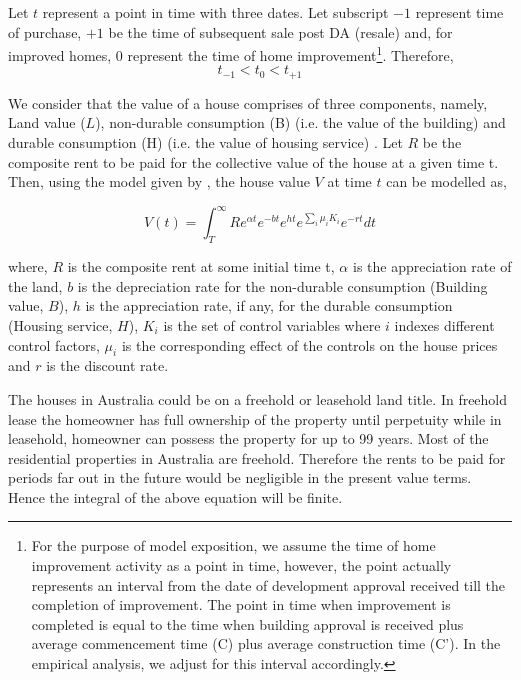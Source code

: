 \documentclass[AEJ,reqno, draftmode]{AEA} %
\begin{document}
Let $t$ represent a point in time with three dates. Let subscript $-1$ represent time of purchase, $+1$ be the time of subsequent sale post DA (resale) and, for improved homes, $0$ represent the time of home improvement\footnote{For the purpose of model exposition, we assume the time of home improvement activity as a point in time, however, the point actually represents an interval from the date of development approval received till the completion of improvement. The point in time when improvement is completed is equal to the time when building approval is received plus average commencement time (C) plus average construction time (C'). In the empirical analysis, we adjust for this interval accordingly.}. Therefore, $$t_{-1} < t_0 < t_{+1}$$ %

We consider that the value of a house comprises of three components, namely, Land value ($L$), non-durable consumption (B) (i.e. the value of the building) and durable consumption (H) (i.e. the value of housing service) \citep{flavin2008model}. Let $R$ be the composite rent to be paid for the collective value of the house at a given time t. Then, using the model given by \citet{kiel1995effect}, the house value $V$ at time $t$ can be modelled as,

\begin{equation}
    V(t) = \int_{T}^{\infty} R e^{\alpha t} e^{-bt} e^{ht} e^{\sum_{i} \mu_i K_i} e^{-rt} dt
\end{equation}

where, $R$ is the composite rent at some initial time t, $\alpha$ is the appreciation rate of the land, $b$ is the depreciation rate for the non-durable consumption (Building value, $B$), $h$ is the appreciation rate, if any, for the durable consumption (Housing service, $H$), $K_i$ is the set of control variables where $i$ indexes different control factors, $\mu_i$ is the corresponding effect of the controls on the house prices and $r$ is the discount rate. 

The houses in Australia could be on a freehold or leasehold land title. In freehold lease the homeowner has full ownership of the property until perpetuity while in leasehold, homeowner can possess the property for up to 99 years. Most of the residential properties in Australia are freehold. Therefore the rents to be paid for periods far out in the future would be negligible in the present value terms. Hence the integral of the above equation will be finite. 
\end{document}
